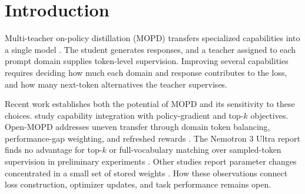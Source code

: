 \section{Introduction}
\label{sec:intro}

Multi-teacher on-policy distillation (MOPD) transfers specialized capabilities into a single model \citep{xiaomi2026mimov2flash,nvidia2026nemotron3ultra,kimiteam2026kimik3openfrontier,deepseekai2026deepseekv4highlyefficientmilliontoken}. The student generates responses, and a teacher assigned to each prompt domain supplies token-level supervision. Improving several capabilities requires deciding how much each domain and response contributes to the loss, and how many next-token alternatives the teacher supervises.

Recent work establishes both the potential of MOPD and its sensitivity to these choices. \citet{ma2026mopdmultiteacheronpolicydistillation} study capability integration with policy-gradient and top-$k$ objectives. Open-MOPD addresses uneven transfer through domain token balancing, performance-gap weighting, and refreshed rewards \citep{gao2026openmopddiagnosingfixingcapability}. The Nemotron 3 Ultra report finds no advantage for top-$k$ or full-vocabulary matching over sampled-token supervision in preliminary experiments \citep[Section~3.3.5]{nvidia2026nemotron3ultra}. Other studies report parameter changes concentrated in a small set of stored weights \citep{yu2026denseupdates,shen2026opdgeometry}. How these observations connect loss construction, optimizer updates, and task performance remains open.

